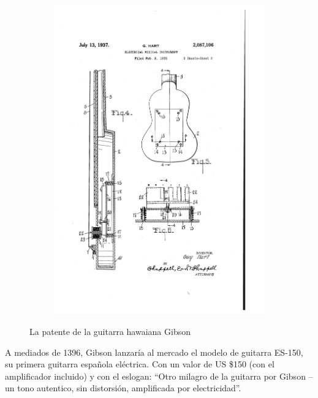 \documentclass{article}
\begin{document}
\begin{figure}[h]
\begin{center}
\begin{subfigure}{0.3\textwidth}
            \includegraphics[scale=0.18]{images/patente4.png}
        \end{subfigure}
    \end{center}
    \vspace{-5pt}
    \caption{La patente de la guitarra hawaiana Gibson}
\end{figure}

A mediados de 1396, Gibson lanzaría al mercado el modelo de guitarra ES-150, su primera guitarra española eléctrica. Con un valor de US \$150 (con el amplificador incluido) y con el eslogan: “Otro milagro de la guitarra por Gibson – un tono autentico, sin distorsión, amplificada por electricidad”.\\

\begingroup
\setlength{\intextsep}{12pt}%
\setlength{\columnsep}{0pt}%
\end{document}
